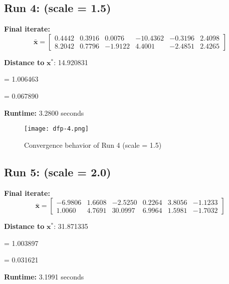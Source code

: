 \documentclass{article}
\begin{document}

\subsection*{Run 4: (scale = 1.5)}
\vspace{1em}

\textbf{Final iterate:}
\[
\bar{\mathbf{x}} =
\begin{bmatrix}
0.4442 & 0.3916 & 0.0076 & -10.4362 & -0.3196 & 2.4098 \\
8.2042 & 0.7796 & -1.9122 & 4.4001 & -2.4851 & 2.4265
\end{bmatrix}
\]

\vspace{0.5em}
\noindent
\textbf{Distance to } $\mathbf{x}^*$: 14.920831

\vspace{0.5em}
\noindent
{} = 1.006463

\noindent
{} = 0.067890

\vspace{0.5em}
\noindent
\textbf{Runtime:} 3.2800 seconds

\begin{figure}[H]
    \centering
    \texttt{[image: dfp-4.png]}
    \caption{Convergence behavior of Run 4 (scale = 1.5)}
    \label{fig:dfp-run4}
\end{figure}


\subsection*{Run 5: (scale = 2.0)}
\vspace{1em}

\textbf{Final iterate:}
\[
\bar{\mathbf{x}} =
\begin{bmatrix}
-6.9806 & 1.6608 & -2.5250 & 0.2264 & 3.8056 & -1.1233 \\
1.0060 & 4.7691 & 30.0997 & 6.9964 & 1.5981 & -1.7032
\end{bmatrix}
\]

\vspace{0.5em}
\noindent
\textbf{Distance to } $\mathbf{x}^*$: 31.871335

\vspace{0.5em}
\noindent
{} = 1.003897

\noindent
{} = 0.031621

\vspace{0.5em}
\noindent
\textbf{Runtime:} 3.1991 seconds
\end{document}
